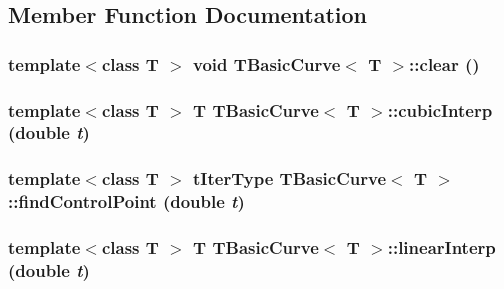 \subsection{Member Function Documentation}
\hypertarget{classTBasicCurve_a0059da8249db22189e80382a2dc908b3}{
\subsubsection[{clear}]{\setlength{\rightskip}{0pt plus 5cm}template$<$class T $>$ void {\bf TBasicCurve}$<$ T $>$::clear ()}}
\label{classTBasicCurve_a0059da8249db22189e80382a2dc908b3}
\hypertarget{classTBasicCurve_ae76a13ad901a5bec94f5cc62731763eb}{
\subsubsection[{cubicInterp}]{\setlength{\rightskip}{0pt plus 5cm}template$<$class T $>$ T {\bf TBasicCurve}$<$ T $>$::cubicInterp (double {\em t})}}
\label{classTBasicCurve_ae76a13ad901a5bec94f5cc62731763eb}
\hypertarget{classTBasicCurve_adaeab401aa125173950c43c5b5ebdbe1}{
\subsubsection[{findControlPoint}]{\setlength{\rightskip}{0pt plus 5cm}template$<$class T $>$ {\bf tIterType} {\bf TBasicCurve}$<$ T $>$::findControlPoint (double {\em t})}}
\label{classTBasicCurve_adaeab401aa125173950c43c5b5ebdbe1}
\hypertarget{classTBasicCurve_ad584a903021913723ff11c6eff6c4b0d}{
\subsubsection[{linearInterp}]{\setlength{\rightskip}{0pt plus 5cm}template$<$class T $>$ T {\bf TBasicCurve}$<$ T $>$::linearInterp (double {\em t})}}

